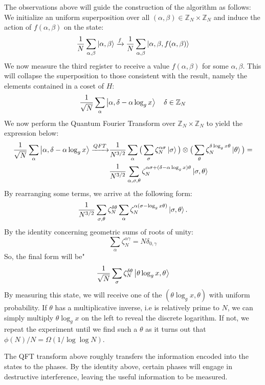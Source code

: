 \documentclass{../quantum.tex}
\begin{document}
The observations above will guide the construction of the algorithm as follows: We initialize an uniform superposition over all $(\alpha,\beta) \in \mathbb{Z}_N \times \mathbb{Z}_N $ and induce the action of $f(\alpha, \beta)$ on the state:
%
\begin{gather}
  \frac{1}{N} \sum_{\alpha,\beta} \ket{\alpha, \beta} \xrightarrow{f} \frac{1}{N} \sum_{\alpha,\beta} \ket{\alpha, \beta, f(\alpha, \beta)}
\end{gather}
%
We now measure the third register to receive a value $f(\alpha,\beta)$ for some $\alpha,\beta$. This will collapse the superposition to those consistent with the result, namely the elements contained in a coset of $H$:
%
\begin{equation}
  \frac{1}{\sqrt{N}} \sum_{\alpha} \ket{\alpha,\delta - \alpha\log_g{x}} \quad \delta \in \mathbb{Z}_N
\end{equation}
%
We now perform the Quantum Fourier Transform over $\mathbb{Z}_N \times \mathbb{Z}_N$ to yield the expression below:
%
\begin{gather}
  \begin{split}
    \frac{1}{\sqrt{N}} \sum_{\alpha} \ket{\alpha,\delta - \alpha\log_g{x}} \xrightarrow{QFT}
    & \frac{1}{N^{3/2}} \sum_{\alpha} \big(\sum_{\sigma} \zeta_N^{\alpha\sigma} \ket{\sigma}\big) \otimes \big(\sum_{\theta} \zeta_N^{\delta\log_g{x}\theta} \ket{\theta} \big) = \\
    & \frac{1}{N^{3/2}}\sum_{\alpha,\sigma,\theta} \zeta_N^{\alpha\sigma + (\delta - \alpha\log_g{x})\theta} \ket{\sigma,\theta}
  \end{split}
\end{gather}
By rearranging some terms, we arrive at the following form:
%
\begin{gather}
\frac{1}{N^{3/2}}\sum_{\sigma,\theta} \zeta_N^{\delta\theta} \sum_{\alpha} \zeta_N^{\alpha(\sigma - \log_g{x}\theta)}\ket{\sigma,\theta}.
\end{gather}
%
By the identity concerning geometric sums of roots of unity:
$$ \sum_{\alpha} \zeta_N^{\alpha\gamma} = N \delta_{0,\gamma} $$
So, the final form will be"
%
$$ \frac{1}{\sqrt{N}} \sum_{\sigma} \zeta_N^{\delta\theta} \ket{\theta\log_g{x},\theta} $$
By measuring this state, we will receive one of the $(\theta\log_g{x}, \theta)$ with uniform probability. If $\theta$ has a multiplicative inverse, i.e is relatively prime to $N$, we can simply multiply $\theta\log_g{x}$ on the left to reveal the discrete logarithm. If not, we repeat the experiment until we find such a $\theta$ as it turns out that $\phi(N) / N = \Omega(1/\log\log{N})$.
%
\begin{remark}
  The QFT transform above roughly transfers the information encoded into the states to the phases. By the identity above, certain phases will engage in destructive interference, leaving the useful information to be measured.
\end{remark}
\end{document}

